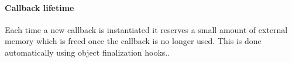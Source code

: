 






\paragraph{Callback lifetime}
Each time a new callback is instantiated it reserves a small amount of external memory which is freed once the callback is no longer used.
This is done automatically using object finalization hooks..


